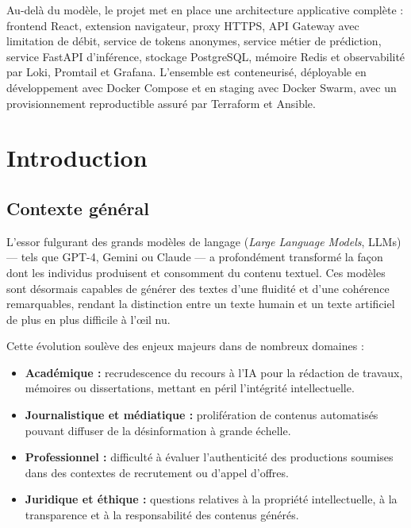﻿\documentclass[12pt, a4paper]{report}
\begin{document}
Au-delà du modèle, le projet met en place une architecture applicative complète :
frontend React, extension navigateur, proxy HTTPS, API Gateway avec limitation
de débit, service de tokens anonymes, service métier de prédiction, service
FastAPI d'inférence, stockage PostgreSQL, mémoire Redis et observabilité par
Loki, Promtail et Grafana. L'ensemble est conteneurisé, déployable en
développement avec Docker Compose et en staging avec Docker Swarm, avec un
provisionnement reproductible assuré par Terraform et Ansible.

\tableofcontents
\clearpage


\chapter{Introduction}

\section{Contexte général}

L'essor fulgurant des grands modèles de langage (\textit{Large Language Models}, LLMs) — 
tels que GPT-4, Gemini ou Claude — a profondément transformé la façon dont les individus 
produisent et consomment du contenu textuel. Ces modèles sont désormais capables de générer 
des textes d'une fluidité et d'une cohérence remarquables, rendant la distinction entre 
un texte humain et un texte artificiel de plus en plus difficile à l'œil nu.

Cette évolution soulève des enjeux majeurs dans de nombreux domaines :

\begin{itemize}
  \item \textbf{Académique :} recrudescence du recours à l'IA pour la rédaction de 
        travaux, mémoires ou dissertations, mettant en péril l'intégrité intellectuelle.
  \item \textbf{Journalistique et médiatique :} prolifération de contenus automatisés 
        pouvant diffuser de la désinformation à grande échelle.
  \item \textbf{Professionnel :} difficulté à évaluer l'authenticité des productions 
        soumises dans des contextes de recrutement ou d'appel d'offres.
  \item \textbf{Juridique et éthique :} questions relatives à la propriété intellectuelle, 
        à la transparence et à la responsabilité des contenus générés.
\end{itemize}
\end{document}
